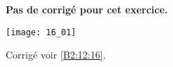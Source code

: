 \normalfalse \difficiletrue \tdifficilefalse
\correctionfalse


\setcounter{numques}{0}
\ifcorrection
\else
\textbf{Pas de corrigé pour cet exercice.}
\fi

\ifprof
\else
\begin{center}
\texttt{[image: 16\_01]}
\end{center}
\fi


\ifprof
\else
\fi



\ifprof
\else
\begin{flushright}
\footnotesize{Corrigé  voir \ref{B2:12:16}.}
\end{flushright}%
\fi